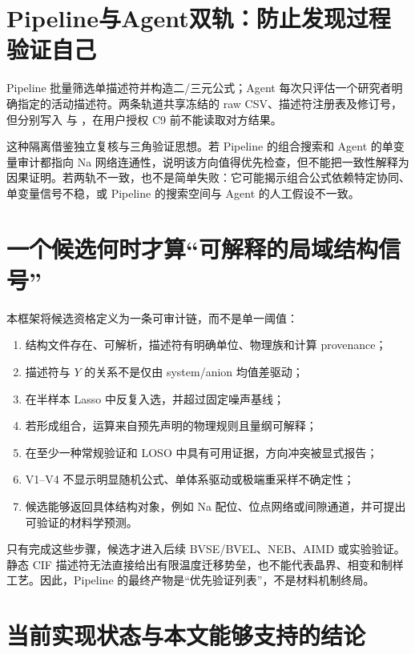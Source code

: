 \section{Pipeline与Agent双轨：防止发现过程验证自己}

Pipeline 批量筛选单描述符并构造二/三元公式；Agent 每次只评估一个研究者明确指定的活动描述符。两条轨道共享冻结的 raw CSV、描述符注册表及修订号，但分别写入  与 ，在用户授权 C9 前不能读取对方结果。

这种隔离借鉴独立复核与三角验证思想。若 Pipeline 的组合搜索和 Agent 的单变量审计都指向 Na 网络连通性，说明该方向值得优先检查，但不能把一致性解释为因果证明。若两轨不一致，也不是简单失败：它可能揭示组合公式依赖特定协同、单变量信号不稳，或 Pipeline 的搜索空间与 Agent 的人工假设不一致。

\section{一个候选何时才算“可解释的局域结构信号”}

本框架将候选资格定义为一条可审计链，而不是单一阈值：

\begin{enumerate}
  \item 结构文件存在、可解析，描述符有明确单位、物理族和计算 provenance；
  \item 描述符与 $Y$ 的关系不是仅由 system/anion 均值差驱动；
  \item 在半样本 Lasso 中反复入选，并超过固定噪声基线；
  \item 若形成组合，运算来自预先声明的物理规则且量纲可解释；
  \item 在至少一种常规验证和 LOSO 中具有可用证据，方向冲突被显式报告；
  \item V1--V4 不显示明显随机公式、单体系驱动或极端重采样不确定性；
  \item 候选能够返回具体结构对象，例如 Na 配位、位点网络或间隙通道，并可提出可验证的材料学预测。
\end{enumerate}

只有完成这些步骤，候选才进入后续 BVSE/BVEL、NEB、AIMD 或实验验证。静态 CIF 描述符无法直接给出有限温度迁移势垒，也不能代表晶界、相变和制样工艺。因此，Pipeline 的最终产物是“优先验证列表”，不是材料机制终局。

\section{当前实现状态与本文能够支持的结论}

